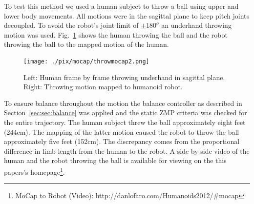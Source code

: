 To test this method we used a human subject to throw a ball using upper and lower body movements.  
All motions were in the sagittal plane to keep pitch joints decoupled.  
To avoid the robot's joint limit of $\pm180^o$ an underhand throwing motion was used.
Fig.~\ref{fig:mocap-underhand} shows the human throwing the ball and the robot throwing the ball to the mapped motion of the human.

\begin{figure}[t]
  \centering
\texttt{[image: ./pix/mocap/throwmocap2.png]}
  \caption{Left: Human frame by frame throwing underhand in sagittal plane.  Right: Throwing motion mapped to humanoid robot.}
  \label{fig:mocap-underhand}
\end{figure}

To ensure balance throughout the motion the balance controller as described in Section~\ref{sec:sec:balance} was applied and the static ZMP criteria was checked for the entire trajectory.
The human subject threw the ball approximately eight feet (244cm).  
The mapping of the latter motion caused the robot to throw the ball approximately five feet (152cm).
The discrepancy comes from the proportional difference in limb length from the human to the robot.
A side by side video of the human and the robot throwing the ball is available for viewing on the this papers's homepage\footnote{MoCap to Robot (Video): http://danlofaro.com/Humanoids2012/\#mocap}.




